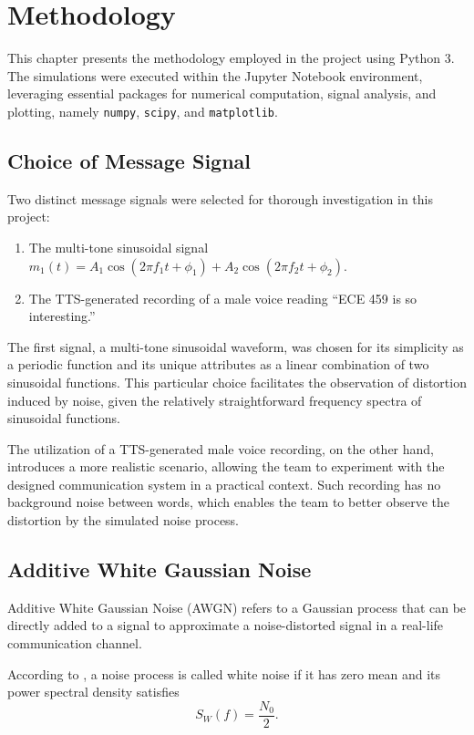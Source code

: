 \documentclass[../ECE459FinalProjectReport.tex]{subfiles}
\begin{document}
\chapter{Methodology}
This chapter presents the methodology employed in the project using Python 3. The simulations were executed within the Jupyter Notebook environment, leveraging essential packages for numerical computation, signal analysis, and plotting, namely \verb|numpy|, \verb|scipy|, and \verb|matplotlib|.

\section{Choice of Message Signal}

Two distinct message signals were selected for thorough investigation in this project:
\begin{enumerate}
    \item The multi-tone sinusoidal signal $m_1 (t) = A_1\cos(2\pi f_1 t + \phi_1) + A_2 \cos(2\pi f_2 t + \phi_2)$.
    \item The TTS-generated recording of a male voice reading ``ECE 459 is so interesting.''
\end{enumerate}

The first signal, a multi-tone sinusoidal waveform, was chosen for its simplicity as a periodic function and its unique attributes as a linear combination of two sinusoidal functions. This particular choice facilitates the observation of distortion induced by noise, given the relatively straightforward frequency spectra of sinusoidal functions. 

The utilization of a TTS-generated male voice recording, on the other hand, introduces a more realistic scenario, allowing the team to experiment with the designed communication system in a practical context. Such recording has no background noise between words, which enables the team to better observe the distortion by the simulated noise process.

\section{Additive White Gaussian Noise}
Additive White Gaussian Noise (AWGN) refers to a Gaussian process that can be directly added to a signal to approximate a noise-distorted signal in a real-life communication channel.

According to \cite[Sec. 8.10]{haykinIntroductionAnalogDigital2007}, a noise process is called white noise if it has zero mean and its power spectral density satisfies
\begin{equation}
    S_W(f) = \frac{N_0}{2}.
\end{equation}
\end{document}
